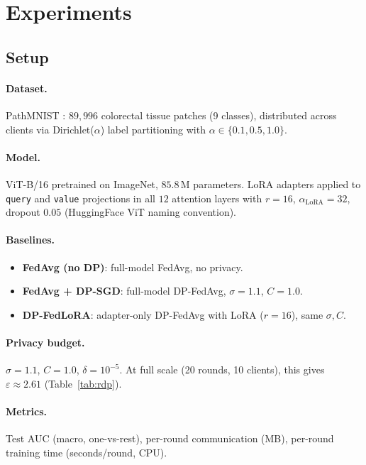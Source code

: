 ﻿\documentclass{article}
\newcommand{\method}{DP-FedLoRA}
\renewcommand{\eps}{\varepsilon}
\newcommand{\noise}{\sigma}
\newcommand{\clip}{C}
\begin{document}
\section{Experiments}
\label{sec:experiments}

\subsection{Setup}

\paragraph{Dataset.}
PathMNIST \citep{yang2023medmnist}: $89{,}996$ colorectal
tissue patches (9 classes), distributed across clients via Dirichlet($\alpha$)
label partitioning with $\alpha \in \{0.1, 0.5, 1.0\}$.

\paragraph{Model.}
ViT-B/16 \citep{dosovitskiy2021image} pretrained on ImageNet,
$85.8$\,M parameters.
LoRA adapters applied to \texttt{query} and \texttt{value} projections in
all $12$ attention layers with $r{=}16$, $\alpha_{\text{LoRA}}{=}32$,
dropout $0.05$ (HuggingFace ViT naming convention).

\paragraph{Baselines.}
\begin{itemize}
  \item \textbf{FedAvg (no DP)}: full-model FedAvg, no privacy.
  \item \textbf{FedAvg + DP-SGD}: full-model DP-FedAvg,
        $\noise{=}1.1$, $\clip{=}1.0$.
  \item \textbf{\method{}}: adapter-only DP-FedAvg with LoRA ($r{=}16$),
        same $\noise, \clip$.
\end{itemize}

\paragraph{Privacy budget.}
$\noise{=}1.1$, $\clip{=}1.0$, $\delta{=}10^{-5}$.
At full scale (20 rounds, 10 clients), this gives $\eps \approx 2.61$
(Table~\ref{tab:rdp}).

\paragraph{Metrics.}
Test AUC (macro, one-vs-rest), per-round communication (MB),
per-round training time (seconds/round, CPU).
\end{document}
